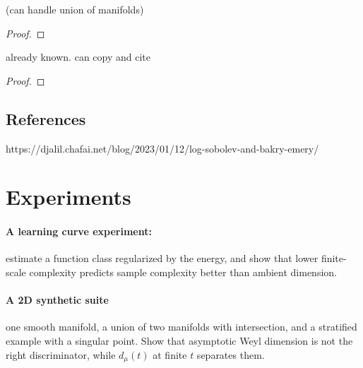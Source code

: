 \documentclass{article}
\begin{document}
\begin{theorem}
    (can handle union of manifolds)
\end{theorem}
\begin{proof}
    
\end{proof}

\begin{corollary}
\end{corollary}


\begin{theorem}
     already known. can copy and cite
\end{theorem}
\begin{proof}
    
\end{proof}


\newpage



\subsection{References}

https://djalil.chafai.net/blog/2023/01/12/log-sobolev-and-bakry-emery/


\newpage


\section{Experiments}

\paragraph{A learning curve experiment:} estimate a function class regularized by the energy, and show that lower finite-scale complexity predicts sample complexity better than ambient dimension.\\

\paragraph{A 2D synthetic suite} one smooth manifold, a union of two manifolds with intersection, and a stratified example with a singular point. Show that asymptotic Weyl dimension is not the right discriminator, while $d_\mu(t)$ at finite $t$ separates them.
\end{document}

